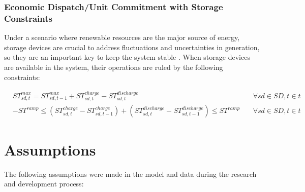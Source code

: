\documentclass[12pt,LUDisStyle,twosided]{book}
\begin{document}
\subsubsection{Economic Dispatch/Unit Commitment with Storage Constraints}

Under a scenario where renewable resources are the major source of energy, storage devices are crucial to address fluctuations and uncertainties in generation, so they are an important key to keep the system stable \cite{dwyer}. When storage devices are available in the system, their operations are ruled by the following constraints:

\begin{subequations}\label{model:storageConstraints}
\begin{alignat}{4}
& ST^{max}_{sd,t} = ST^{max}_{sd,t - 1} + ST^{charge}_{sd,t} - ST^{discharge}_{sd,t}  &~& \forall sd \in SD, t \in t \label{eq:storageLimits} \\
&  -ST^{ramp} \leq (ST^{charge}_{sd,t} - ST^{charge}_{sd,t-1}) + (ST^{discharge}_{sd,t} - ST^{discharge}_{sd,t-1}) \leq ST^{ramp}  &~& \forall sd \in SD, t \in t \label{eq:storageRamping}
\end{alignat} 
\end{subequations}


\section{Assumptions}

The following assumptions were made in the model and data during the research and development process:
\end{document}
